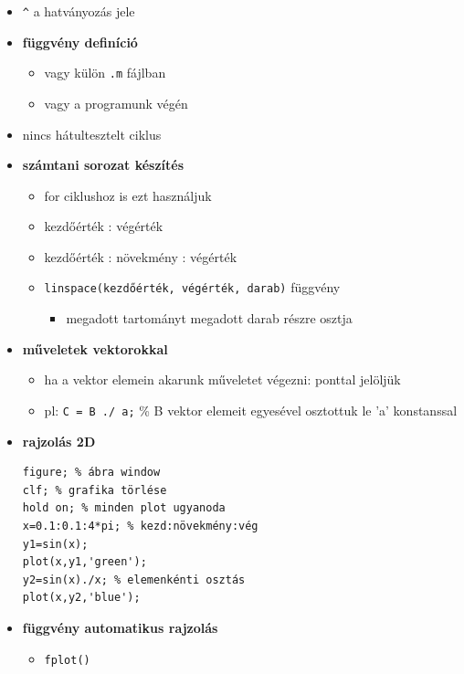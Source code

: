 \begin{itemize}
\begin{itemize}
        \item Xor műveleti jel nincs
        \item \verb|xor()|, \verb|bitxor()| függvények vannak
    \end{itemize}
    \item \verb|^| a hatványozás jele
    \item \textbf{függvény definíció}
    \begin{itemize}
        \item vagy külön \verb|.m| fájlban
        \item vagy a programunk végén
    \end{itemize}
    \item nincs hátultesztelt ciklus
    \item \textbf{számtani sorozat készítés}
    \begin{itemize}
        \item for ciklushoz is ezt használjuk
        \item kezdőérték : végérték
        \item kezdőérték : növekmény : végérték
        \item \verb|linspace(kezdőérték, végérték, darab)| függvény
        \begin{itemize}
            \item megadott tartományt megadott darab részre osztja
        \end{itemize}
    \end{itemize}
    \item \textbf{műveletek vektorokkal}
    \begin{itemize}
        \item ha a vektor elemein akarunk műveletet végezni: ponttal jelöljük
        \item pl: \verb|C = B ./ a;|  \% B vektor elemeit egyesével osztottuk le 'a' konstanssal
    \end{itemize}
    \item \textbf{rajzolás 2D}
\begin{verbatim}
figure; % ábra window
clf; % grafika törlése
hold on; % minden plot ugyanoda
x=0.1:0.1:4*pi; % kezd:növekmény:vég
y1=sin(x);
plot(x,y1,'green');
y2=sin(x)./x; % elemenkénti osztás
plot(x,y2,'blue');
\end{verbatim}
    \item \textbf{függvény automatikus rajzolás}
    \begin{itemize}
        \item \verb|fplot()|

\end{itemize}
\end{itemize}
